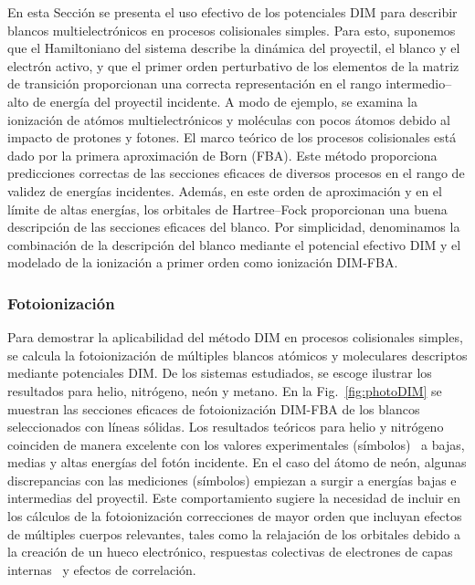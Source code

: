 En esta Sección se presenta el uso efectivo de los potenciales DIM para
describir blancos multielectrónicos en procesos colisionales simples. 
Para esto, suponemos que el Hamiltoniano del sistema describe la 
dinámica del proyectil, el blanco y el electrón activo, y que el primer 
orden perturbativo de los elementos de la matriz de transición 
proporcionan una correcta representación en el rango intermedio--alto
de energía del proyectil incidente. A modo de ejemplo, se examina la 
ionización de atómos multielectrónicos y moléculas con pocos átomos 
debido al impacto de protones y fotones. El marco teórico de los 
procesos colisionales está dado por la primera aproximación de Born 
(FBA). Este método proporciona predicciones correctas de las secciones 
eficaces de diversos procesos en el rango de validez de energías 
incidentes. Además, en este orden de aproximación  y en el límite de 
altas energías, los orbitales de Hartree--Fock proporcionan una buena 
descripción de las secciones eficaces del blanco.
Por simplicidad, denominamos la combinación de la descripción del blanco 
mediante el potencial efectivo DIM y el modelado de la ionización a 
primer orden como ionización DIM-FBA. 

\subsubsection{Fotoionización}

Para demostrar la aplicabilidad del método DIM en procesos colisionales 
simples, se calcula la fotoionización de múltiples blancos atómicos y 
moleculares descriptos mediante potenciales DIM. De los sistemas 
estudiados, se escoge ilustrar los resultados para helio, nitrógeno, 
neón y metano. En la Fig.~\ref{fig:photoDIM} se muestran las secciones
eficaces de fotoionización DIM-FBA de los blancos seleccionados con 
líneas sólidas. Los resultados teóricos para helio y nitrógeno coinciden 
de manera excelente con los valores experimentales 
(símbolos)~\cite{Samson:90,Henke:93,Stolte:16} a bajas, medias y altas 
energías del fotón incidente. En el caso del átomo de neón, algunas 
discrepancias con las mediciones (símbolos) \cite{Henke:93,Samson:02} 
empiezan a surgir a energías bajas e intermedias del proyectil. Este 
comportamiento sugiere la necesidad de incluir en los cálculos de la 
fotoionización correcciones de mayor orden que incluyan efectos de 
múltiples cuerpos relevantes, tales como la relajación de los orbitales 
debido a la creación de un hueco electrónico, respuestas colectivas de 
electrones de capas internas~\cite{Ederer:64} y efectos de correlación.


